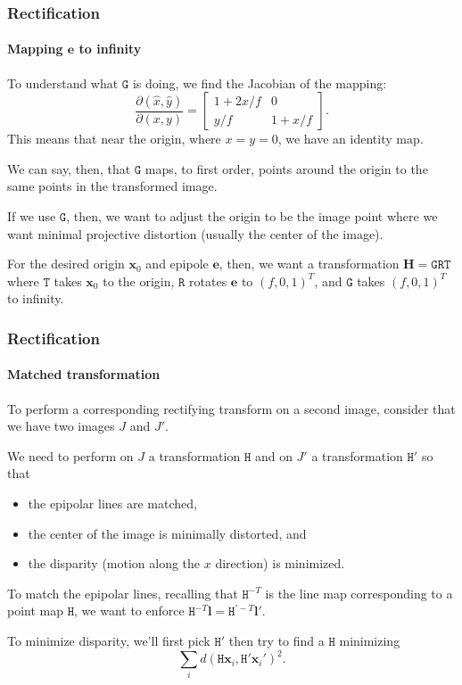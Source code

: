 \documentclass[aspectratio=169]{beamer}
\renewcommand{\vec}[1]{\boldsymbol{#1}}
\newcommand{\mat}[1]{\mathtt{#1}}
\begin{document}
\begin{frame}
\frametitle{Rectification}
\framesubtitle{Mapping $\vec{e}$ to infinity}

To understand what $\mat{G}$ is doing, we find the Jacobian
of the mapping:
\begin{equation*}
\frac{\partial(\hat{x},\hat{y})}{\partial(x,y)} =
\begin{bmatrix} 1+2x/f & 0 \\ y/f & 1+x/f \end{bmatrix}.
\end{equation*}
This means that near the origin, where $x=y=0$, we have an
\alert{identity map}.

\medskip

We can say, then, that $\mat{G}$ maps, to first order, points around
the origin to the \alert{same points} in the transformed image.

\medskip

If we use $\mat{G}$, then, we want to adjust the origin to be the
image point where we want \alert{minimal projective distortion}
(usually the center of the image).

\medskip

For the desired origin $\vec{x}_0$ and epipole $\vec{e}$, then, we want a
transformation $\vec{H}=\mat{G}\mat{R}\mat{T}$ where $\mat{T}$ takes
$\vec{x}_0$ to the origin, $\mat{R}$ rotates $\vec{e}$ to $(f,0,1)^T$,
and $\mat{G}$ takes $(f,0,1)^T$ to infinity.

\end{frame}

\begin{frame}
\frametitle{Rectification}
\framesubtitle{Matched transformation}

To perform a \alert{corresponding rectifying transform} on a second
image, consider that we have two images $J$ and $J'$.

\medskip

We need to perform on $J$ a transformation $\mat{H}$ and on $J'$ a
transformation $\mat{H}'$ so that
\begin{itemize}
\item the \alert{epipolar lines are matched},
\item the center of the image is minimally distorted, and
\item the \alert{disparity} (motion along the $x$ direction) \alert{is
    minimized}.
\end{itemize}

\medskip

To match the epipolar lines, recalling that $\mat{H}^{-T}$ is the line
map corresponding to a point map $\mat{H}$, we want to enforce
$\mat{H}^{-T}\vec{l}=\mat{H}^{\prime-T}\vec{l}'.$

\medskip

To minimize disparity, we'll first pick $\mat{H}'$ then try to find a
$\mat{H}$ minimizing
\begin{equation*}
\sum_i d(\mat{H}\vec{x}_i,\mat{H}'\vec{x}_i')^2.
\end{equation*}

\end{frame}
\end{document}
